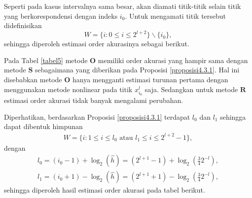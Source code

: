Seperti pada kasus intervalnya sama besar, akan diamati titik-titik selain titik yang berkorespondensi dengan indeks $i_0$. Untuk mengamati titik tersebut didefinisikan $$W = \{ i : 0 \leq i \leq 2^{l+2}\} \backslash \{i_0\},$$ sehingga diperoleh estimasi order akurasinya sebagai berikut.

\begin{table}[htp]
        \centering
        \caption{Tabel estimasi order akurasi eksperimen pertama dengan interval tidak sama besar $\hat{h}=\frac{3}{4}2^{-l}$, $l \in \{3,5,7,9\}$, $W=\{ i : 0\leq i \leq 2^{l+2} \} \backslash \{i_0\}$}
        \label{tabel5}
    \end{table}

Pada Tabel \ref{tabel5} metode $\textbf{O}$ memiliki order akurasi yang hampir sama dengan metode $\textbf{S}$ sebagaimana yang diberikan pada Proposisi \ref{proposisi4.3.1}. Hal ini disebabkan metode $\textbf{O}$ hanya mengganti estimasi turunan pertama dengan menggunakan metode nonlinear pada titik $x_{i_0}^l$ saja. Sedangkan untuk metode $\textbf{R}$ estimasi order akurasi tidak banyak mengalami perubahan.

Diperhatikan, berdasarkan Proposisi \ref{proposisi4.3.1} terdapat $l_0$ dan $l_1$ sehingga dapat dibentuk himpunan
\begin{align*}
    W = \{ i : 1 \leq i \leq l_0 \text{ atau } l_1 \leq i \leq 2^{l+2} - 1 \},
\end{align*}
dengan
\begin{align*}
    l_0 = (i_0 - 1) + \log_2(\hat{h}) = (2^{l+1} - 1) + \log_2(\frac{3}{4} 2^{-l}), \\
    l_1 = (i_0 + 1) - \log_2(\hat{h}) = (2^{l+1} + 1) - \log_2(\frac{3}{4} 2^{-l}),
\end{align*}
sehingga diperoleh hasil estimasi order akurasi pada tabel berikut.

